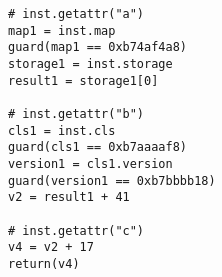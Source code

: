 \begin{lstlisting}[mathescape,basicstyle=\ttfamily]
# inst.getattr("a")
map1 = inst.map
guard(map1 == 0xb74af4a8)
storage1 = inst.storage
result1 = storage1[0]

# inst.getattr("b")
cls1 = inst.cls
guard(cls1 == 0xb7aaaaf8)
version1 = cls1.version
guard(version1 == 0xb7bbbb18)
v2 = result1 + 41

# inst.getattr("c")
v4 = v2 + 17
return(v4)
\end{lstlisting}
